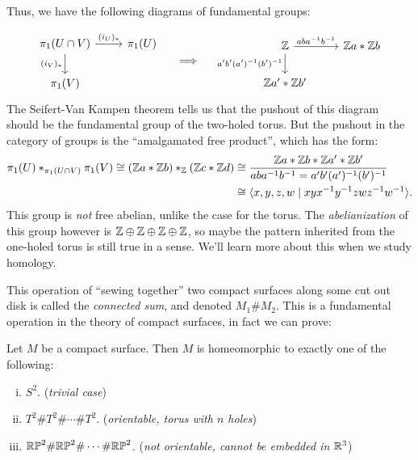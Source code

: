 Thus, we have the following diagrams of fundamental groups:

\[
\begin{tikzcd}
{\pi_1(U\cap V)} & {\pi_1(U)} \\
{\pi_1(V)}
\arrow["{(i_V)_*}"', from=1-1, to=2-1]
\arrow["{(i_U)_*}", from=1-1, to=1-2]
\end{tikzcd}\quad\implies\quad
\begin{tikzcd}
	\Z & {\Z a*\Z b} \\
	{\Z a'*\Z b'}
	\arrow["{aba^{-1}b^{-1}}", from=1-1, to=1-2]
	\arrow["{a'b'(a')^{-1}(b')^{-1}}"', from=1-1, to=2-1]
\end{tikzcd}
\]
The Seifert-Van Kampen theorem tells us that the pushout of this diagram should be the fundamental group of the two-holed torus. But the pushout in the category of groups is the ``amalgamated free product'', which has the form:
\[\begin{aligned}\pi_1(U)*_{\pi_1(U\cap V)} \pi_1(V) \cong (\mathbb{Z} a * \mathbb{Z} b) *_{\mathbb{Z}} (\mathbb{Z} c * \mathbb{Z} d) &\cong\frac{\mathbb{Z} a * \mathbb{Z} b * \mathbb{Z} a' * \mathbb{Z} b'}{aba^{-1}b^{-1}=a'b'(a')^{-1}(b')^{-1}}\\
&\cong \langle x, y, z, w \mid xyx^{-1}y^{-1} zwz^{-1}w^{-1}\rangle.\end{aligned}\]
This group is \emph{not} free abelian, unlike the case for the torus. The \emph{abelianization} of this group however is $\mathbb{Z}\oplus \mathbb{Z} \oplus \mathbb{Z} \oplus \mathbb{Z}$, so maybe the pattern inherited from the one-holed torus is still true in a sense. We'll learn more about this when we study homology.

\medskip
This operation of ``sewing together'' two compact surfaces along some cut out disk is called the \emph{connected sum}, and denoted $M_1 \# M_2$. This is a fundamental operation in the theory of compact surfaces, in fact we can prove:

\begin{claim}
    Let $M$ be a compact surface. Then $M$ is homeomorphic to exactly one of the following:
    \begin{enumerate}[(i)]
        \item $S^2$. (\emph{trivial case})
        \item $T^2 \# T^2 \# \cdots \# T^2$. (\emph{orientable, torus with $n$ holes})
        \item $\mathbb{RP}^2 \# \mathbb{RP}^2 \# \cdots \# \mathbb{RP}^2$. (\emph{not orientable, cannot be embedded in $\mathbb{R}^3$})
    \end{enumerate}
\end{claim}

